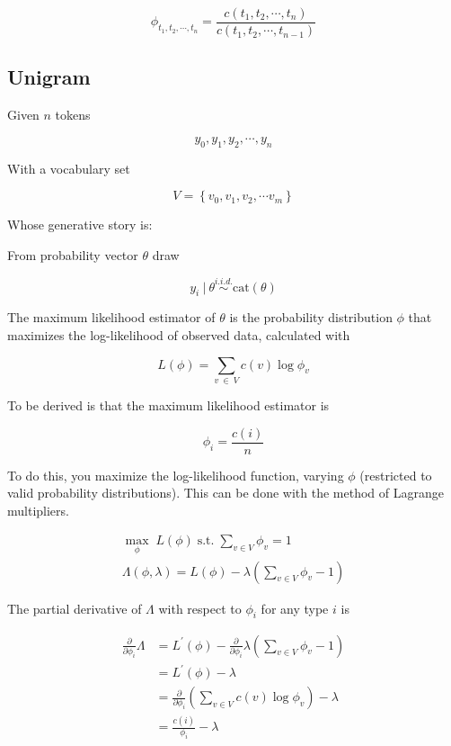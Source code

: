 \documentclass[11pt]{article}
\begin{document}
$$\phi_{t_1, t_2, \cdots , t_n} = \frac{c \left( t_1, t_2, \cdots , t_n \right)}{c \left( t_1, t_2, \cdots , t_{n - 1} \right)}$$

\subsection{Unigram}
Given $n$ tokens

$$ y_0, y_1, y_2, \cdots, y_n $$

With a vocabulary set 

$$ V = \left\{ v_0, v_1, v_2, \cdots v_m \right\} $$

Whose generative story is:

From probability vector $\theta$ draw

$$ y_i \: \lvert \: \theta \stackrel{i.i.d.}{\sim} \text{cat} \left( \theta \right) $$

The maximum likelihood estimator of $\theta$ is the probability distribution $\phi$ that maximizes the log-likelihood of observed data, calculated with

$$ L \left( \phi \right) = \sum \limits_{v \: \in \: V} c \left( v \right) \log{\phi_v} $$

To be derived is that the maximum likelihood estimator is

$$\phi_i = \frac{c \left( i \right)}{n}$$

To do this, you maximize the log-likelihood function, varying $\phi$ (restricted to valid probability distributions). This can be done with the method of Lagrange multipliers.

\begin{align*}
\max \limits_{\phi} \; L\left( \phi \right) \; \text{s.t.} \; \sum \limits_{v \in V} \phi_{v} = 1 \\
%
\Lambda \left( \phi, \lambda \right) = L\left( \phi \right) - \lambda \left( \sum \limits_{v \in V} \phi_{v} - 1 \right)
\end{align*}

The partial derivative of $\Lambda$ with respect to $\phi_i$ for any type $i$ is

\begin{align*}
%
\frac{\partial}{\partial \phi_i} \Lambda &= L^\prime \left( \phi \right) - \frac{\partial}{\partial \phi_i} \lambda \left( \sum \limits_{v \in V} \phi_{v} - 1 \right) \\
%
&= L^\prime \left( \phi \right) - \lambda \\
%
&= \frac{\partial}{\partial \phi_i} \left( \sum \limits_{v \in V} c \! \left( v \right) \log{\phi_v} \right) - \lambda \\
%
&= \frac{c \left( i \right)}{\phi_i} - \lambda
\end{align*}
\end{document}
